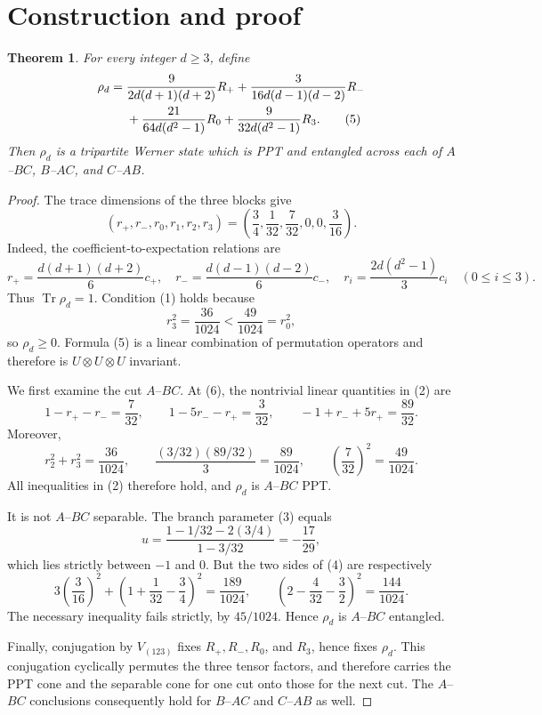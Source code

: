 \documentclass[11pt]{article}
\newtheorem{theorem}{Theorem}
\newcommand{\tr}{\operatorname{Tr}}
\begin{document}
\section{Construction and proof}

\begin{theorem}\label{thm:main}
For every integer $d\ge3$, define
\begin{align}
\rho_d={}&\frac{9}{2d(d+1)(d+2)}R_+
 +\frac{3}{16d(d-1)(d-2)}R_- \notag\\
&+\frac{21}{64d(d^2-1)}R_0
 +\frac{9}{32d(d^2-1)}R_3.                                           \tag{5}
\end{align}
Then $\rho_d$ is a tripartite Werner state which is PPT and entangled across
each of $A$--$BC$, $B$--$AC$, and $C$--$AB$.
\end{theorem}

\begin{proof}
The trace dimensions of the three blocks give
\[
 (r_+,r_-,r_0,r_1,r_2,r_3)
 =\left(\frac34,\frac1{32},\frac7{32},0,0,\frac3{16}\right).           \tag{6}
\]
Indeed, the coefficient-to-expectation relations are
\[
 r_+=\frac{d(d+1)(d+2)}6c_+,\quad
 r_-=\frac{d(d-1)(d-2)}6c_-,\quad
 r_i=\frac{2d(d^2-1)}3c_i\quad(0\le i\le3).
\]
Thus $\tr\rho_d=1$.  Condition (1) holds because
\[
 r_3^2=\frac{36}{1024}<\frac{49}{1024}=r_0^2,                          \tag{7}
\]
so $\rho_d\ge0$.  Formula (5) is a linear combination of permutation
operators and therefore is $U\otimes U\otimes U$ invariant.

We first examine the cut $A$--$BC$.  At (6), the nontrivial linear quantities
in (2) are
\[
 1-r_+-r_-=\frac7{32},\qquad
 1-5r_--r_+=\frac3{32},\qquad
 -1+r_-+5r_+=\frac{89}{32}.                                          \tag{8}
\]
Moreover,
\[
 r_2^2+r_3^2=\frac{36}{1024},\qquad
 \frac{(3/32)(89/32)}3=\frac{89}{1024},\qquad
 \left(\frac7{32}\right)^2=\frac{49}{1024}.                          \tag{9}
\]
All inequalities in (2) therefore hold, and $\rho_d$ is $A$--$BC$ PPT.

It is not $A$--$BC$ separable.  The branch parameter (3) equals
\[
 u=\frac{1-1/32-2(3/4)}{1-3/32}=-\frac{17}{29},                        \tag{10}
\]
which lies strictly between $-1$ and $0$.  But the two sides of (4) are
respectively
\[
 3\left(\frac3{16}\right)^2
 +\left(1+\frac1{32}-\frac34\right)^2
 =\frac{189}{1024},\qquad
 \left(2-\frac4{32}-\frac32\right)^2
 =\frac{144}{1024}.                                                    \tag{11}
\]
The necessary inequality fails strictly, by $45/1024$.  Hence $\rho_d$ is
$A$--$BC$ entangled.

Finally, conjugation by $V_{(123)}$ fixes $R_+,R_-,R_0$, and $R_3$, hence
fixes $\rho_d$.  This conjugation cyclically permutes the three tensor factors,
and therefore carries the PPT cone and the separable cone for one cut onto
those for the next cut.  The $A$--$BC$ conclusions consequently hold for
$B$--$AC$ and $C$--$AB$ as well.
\end{proof}
\end{document}
